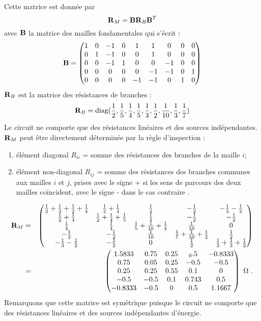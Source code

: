 
Cette matrice est donnée par
\[{\bf R}_M={\bf B}{\bf R}_B{\bf B}^T\]
avec ${\bf B}$ la matrice des mailles fondamentales qui s'écrit :
\[{\bf B}=
\begin{pmatrix}
1 & 0 & -1 & 0 & 1 & 1 & 0 & 0 & 0\\
0 & 1 & -1 & 0 & 0 & 1 & 0 & 0 & 0\\
0 & 0 & -1 & 1 & 0 & 0 & -1 & 0 & 0 \\
0 & 0 & 0 & 0 & 0  & -1 & -1 & 0 & 1 \\
0 & 0 & 0 & 0 & -1 & -1 & 0 & 1 & 0
\end{pmatrix}\]
${\bf R}_B$ est la matrice des résistances de branches :
\[ {\bf R}_B=\mbox{diag}(\dfrac{1}{2},\dfrac{1}{5},\dfrac{1}{4},
\dfrac{1}{5},\dfrac{1}{3},\dfrac{1}{2},\dfrac{1}{10},
\dfrac{1}{3},\dfrac{1}{7})\]
Le circuit ne comporte que des résistances linéaires et des sources
indépendantes. ${\bf R}_M$ peut  être directement déterminée par la règle
d'inspection :
\begin{enumerate}
	\item élément diagonal $R_{ii}$ = somme des résistances
	des branches de la maille $i$;
	\item élément non-diagonal $R_{ij}$ = somme des résistances des branches communes aux
	mailles $i$ et $j$, prises avec le signe + si les sens de parcours des
	deux mailles coïncident, avec le signe - dans le cas contraire .
\end{enumerate}
\begin{eqnarray*}
	{\bf R}_M & = &
	\begin{pmatrix}
		\frac{1}{2}+\frac{1}{3}+\frac{1}{2}+\frac{1}{4} & 
		\frac{1}{2}+\frac{1}{4} & \frac{1}{4} & -\frac{1}{2} & -\frac{1}{3}-\frac{1}{2}\\
		\frac{1}{2}+\frac{1}{4}& \frac{1}{2}+\frac{1}{4}+\frac{1}{5} & 
		\frac{1}{4} & -\frac{1}{2} & -\frac{1}{2}\\
		\frac{1}{4} & \frac{1}{4}& \frac{1}{5}+\frac{1}{10}+\frac{1}{4} & 
		\frac{1}{10} & 0 \\
		-\frac{1}{2}& -\frac{1}{2}& \frac{1}{10}& 
		\frac{1}{7}+\frac{1}{10}+\frac{1}{2} & \frac{1}{2}\\
		-\frac{1}{3}-\frac{1}{2} & -\frac{1}{2} & 0 & \frac{1}{2}  & 
		\frac{1}{3}+\frac{1}{3}+\frac{1}{2}
	\end{pmatrix}\\
	& = & 
	\begin{pmatrix}
		1.5833 & 0.75 & 0.25 & _0.5 & -0.8333\\
		0.75 & 0.05 & 0.25 & -0.5 & -0.5 \\
		0.25 & 0.25 & 0.55 & 0.1 & 0  \\
		-0.5 & -0.5 & 0.1 & 0.743 & 0.5 \\
		-0.8333 & -0.5 & 0 & 0.5 & 1.1667
	\end{pmatrix}\,\, \Omega\text{~.}
\end{eqnarray*}
Remarquons que cette matrice est symétrique puisque le circuit ne
comporte que des résistances linéaires et des sources indépendantes
d'énergie.

